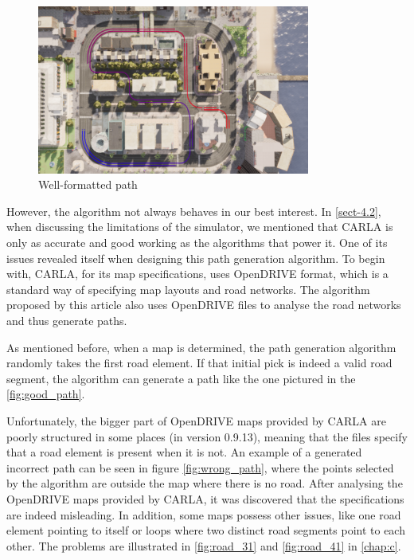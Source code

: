 \begin{figure}
    \centering
    \includegraphics[width = 0.8\textwidth]{research_paper/Images/path1.png}
    \caption{Well-formatted path}
    \label{fig:good_path}
\end{figure}

However, the algorithm not always behaves in our best interest. In \autoref{sect-4.2}, when discussing the limitations of the simulator, we mentioned that CARLA is only as accurate and good working as the algorithms that power it. One of its issues revealed itself when designing this path generation algorithm. To begin with, CARLA, for its map specifications, uses OpenDRIVE format, which is a standard way of specifying map layouts and road networks\cite{dupuis2010opendrive}. The algorithm proposed by this article also uses OpenDRIVE files to analyse the road networks and thus generate paths.

As mentioned before, when a map is determined, the path generation algorithm randomly takes the first road element. If that initial pick is indeed a valid road segment, the algorithm can generate a path like the one pictured in the \autoref{fig:good_path}.

Unfortunately, the bigger part of OpenDRIVE maps provided by CARLA are poorly structured in some places (in version 0.9.13), meaning that the files specify that a road element is present when it is not. An example of a generated incorrect path can be seen in figure \autoref{fig:wrong_path}, where the points selected by the algorithm are outside the map where there is no road. After analysing the OpenDRIVE maps provided by CARLA, it was discovered that the specifications are indeed misleading. In addition, some maps possess other issues, like one road element pointing to itself or loops where two distinct road segments point to each other. The problems are illustrated in \autoref{fig:road_31} and \autoref{fig:road_41} in \autoref{chap:c}.

